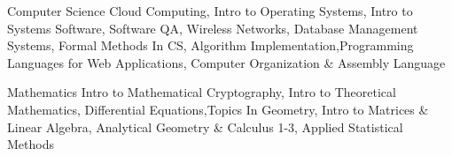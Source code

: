 
\vspace{0mm}
\begin{cvskills}

  \vspace{1mm}

  \cvskill
    {Computer Science} %
    {Cloud Computing, Intro to Operating Systems, Intro to Systems Software, Software QA, Wireless Networks, Database Management Systems, Formal Methods In CS, Algorithm Implementation,\newline Programming Languages for Web Applications, Computer Organization \& Assembly Language} %

   \cvskill
    {Mathematics} %
	{Intro to Mathematical Cryptography, Intro to Theoretical Mathematics, Differential Equations,\newline Topics In Geometry, Intro to Matrices \& Linear Algebra, Analytical Geometry \& Calculus 1-3, Applied Statistical Methods} %


\end{cvskills}